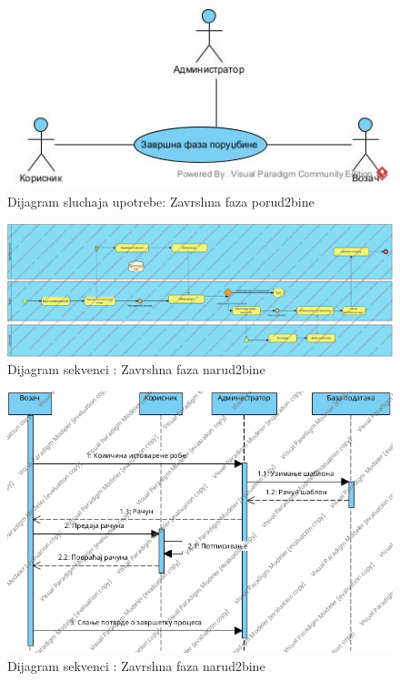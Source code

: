 \begin{figure}[H]
	\includegraphics[scale=0.4]{Slike/UML/SUzavrsnaFaza.jpg}
	\centering
	\caption{Dijagram sluchaja upotrebe: Zavrshna faza porud2bine}
	\label{ucZavrsnaFaza}
\end{figure}

\newpage

\begin{figure}[H]
	\includegraphics[scale=0.25, angle=90]{Slike/BPMN/BPMNzavrsnaFazaPorudzbine.jpg}
	\centering
	\caption{Dijagram sekvenci : Zavrshna faza narud2bine}
	\label{ucZavrsnaFazaSekvence1}
\end{figure}
\begin{figure}[H]
	\includegraphics[scale=0.4]{Slike/DFD/SUzavrsnaFazaProudzbineSequence Diagram1.jpg}
	\centering
	\caption{Dijagram sekvenci : Zavrshna faza narud2bine}
	\label{ucZavrsnaFazaSekvence}
\end{figure}

